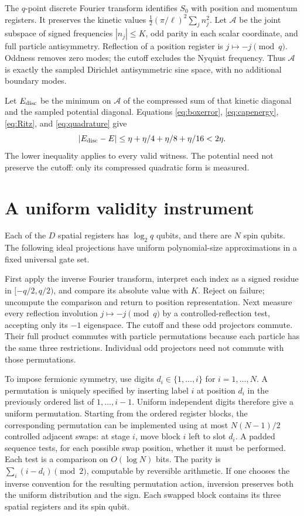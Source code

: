 \documentclass[11pt]{article}
\theoremstyle{remark}\newtheorem{remark}[theorem]{Remark}
\numberwithin{equation}{section}
\begin{document}
The $q$-point discrete Fourier transform identifies $S_0$ with position
and momentum registers. It preserves the kinetic values
$\frac12(\pi/\ell)^2\sum_j n_j^2$.
Let $\mathcal A$ be the joint subspace of signed frequencies $|n_j|\leq K$,
odd parity in each scalar coordinate, and full particle antisymmetry.
Reflection of a position register is $j\mapsto-j\pmod q$.
Oddness removes zero modes; the cutoff excludes the Nyquist frequency.
Thus $\mathcal A$ is exactly the sampled Dirichlet antisymmetric sine
space, with no additional boundary modes.

Let $E_{\rm disc}$ be the minimum on $\mathcal A$ of the compressed sum of
that kinetic diagonal and the sampled potential diagonal. Equations
\eqref{eq:boxerror}, \eqref{eq:capenergy}, \eqref{eq:Ritz}, and
\eqref{eq:quadrature} give
\begin{equation}\label{eq:total}
 |E_{\rm disc}-E|\leq
 \eta+\eta/4+\eta/8+\eta/16<2\eta.
\end{equation}
The lower inequality applies to every valid witness. The potential need
not preserve the cutoff: only its compressed quadratic form is measured.

\section{A uniform validity instrument}
\label{sec:instrument}
Each of the $D$ spatial registers has $\log_2q$ qubits, and there are $N$
spin qubits. The following ideal projections have uniform polynomial-size
approximations in a fixed universal gate set.

First apply the inverse Fourier transform, interpret each index as a signed
residue in $[-q/2,q/2)$, and compare its absolute value with $K$. Reject
on failure; uncompute the comparison and return to position representation.
Next measure every reflection involution $j\mapsto-j\pmod q$ by a
controlled-reflection test, accepting only its $-1$ eigenspace. The cutoff
and these odd projectors commute. Their full product commutes with particle
permutations because each particle has the same three restrictions.
Individual odd projectors need not commute with those permutations.

To impose fermionic symmetry, use digits $d_i\in\{1,\ldots,i\}$ for
$i=1,\ldots,N$. A permutation is uniquely specified by inserting label $i$
at position $d_i$ in the previously ordered list of $1,\ldots,i-1$.
Uniform independent digits therefore give a uniform permutation.
Starting from the ordered register blocks, the corresponding permutation
can be implemented using at most $N(N-1)/2$ controlled adjacent swaps:
at stage $i$, move block $i$ left to slot $d_i$. A padded sequence tests,
for each possible swap position, whether it must be performed. Each test
is a comparison on $O(\log N)$ bits. The parity is
$\sum_i(i-d_i)\pmod2$, computable by reversible arithmetic. If one chooses
the inverse convention for the resulting permutation action, inversion
preserves both the uniform distribution and the sign. Each swapped block
contains its three spatial registers and its spin qubit.
\end{document}
